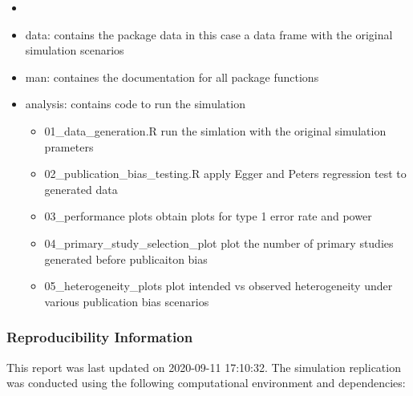 \documentclass[
  english,
  doc,floatsintext,draftall]{apa6}
\providecommand{\tightlist}{%
  \setlength{\itemsep}{0pt}\setlength{\parskip}{0pt}}
\begin{document}
\begin{itemize}
\item
\item
  data: contains the package data in this case a data frame with the original simulation scenarios
\item
  man: containes the documentation for all package functions
\item
  analysis: contains code to run the simulation

  \begin{itemize}
  \tightlist
  \item
    01\_data\_generation.R
    run the simlation with the original simulation prameters
  \item
    02\_publication\_bias\_testing.R
    apply Egger and Peters regression test to generated data
  \item
    03\_performance plots obtain plots for type 1 error rate and power
  \item
    04\_primary\_study\_selection\_plot plot the number of primary studies generated before publicaiton bias
  \item
    05\_heterogeneity\_plots plot intended vs observed heterogeneity under various publication bias scenarios
  \end{itemize}
\end{itemize}

\hypertarget{reproducibility-information}{%
\subsubsection{Reproducibility Information}\label{reproducibility-information}}

This report was last updated on 2020-09-11 17:10:32.
The simulation replication was conducted using the following computational environment and dependencies:
\end{document}
